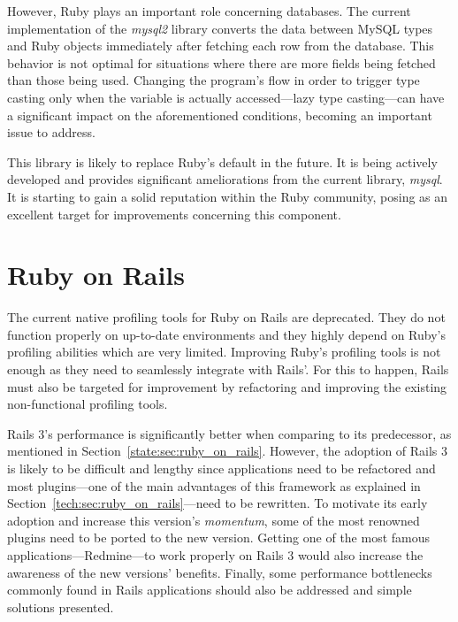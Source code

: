 However, Ruby plays an important role concerning databases. The current implementation of the \textit{mysql2} library converts the data between MySQL types and Ruby objects immediately after fetching each row from the database. This behavior is not optimal for situations where there are more fields being fetched than those being used. Changing the program's flow in order to trigger type casting only when the variable is actually accessed---lazy type casting---can have a significant impact on the aforementioned conditions, becoming an important issue to address.

This library is likely to replace Ruby's default in the future. It is being actively developed and provides significant ameliorations from the current library, \textit{mysql}. It is starting to gain a solid reputation within the Ruby community, posing as an excellent target for improvements concerning this component.

\section{Ruby on Rails}
The current native profiling tools for Ruby on Rails are deprecated. They do not function properly on up-to-date environments and they highly depend on Ruby's profiling abilities which are very limited. Improving Ruby's profiling tools is not enough as they need to seamlessly integrate with Rails'. For this to happen, Rails must also be targeted for improvement by refactoring and improving the existing non-functional profiling tools.

Rails 3's performance is significantly better when comparing to its predecessor, as mentioned in Section~\ref{state:sec:ruby_on_rails}. However, the adoption of Rails 3 is likely to be difficult and lengthy since applications need to be refactored and most plugins---one of the main advantages of this framework as explained in Section~\ref{tech:sec:ruby_on_rails}---need to be rewritten. To motivate its early adoption and increase this version's \textit{momentum}, some of the most renowned plugins need to be ported to the new version. Getting one of the most famous applications---Redmine---to work properly on Rails 3 would also increase the awareness of the new versions' benefits. Finally, some performance bottlenecks commonly found in Rails applications should also be addressed and simple solutions presented.
